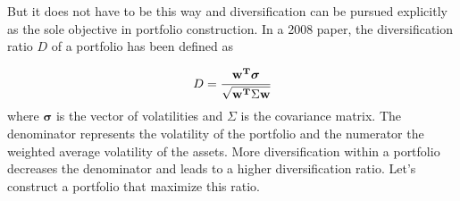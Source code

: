 But it does not have to be this way and diversification can be pursued explicitly as the sole objective in portfolio construction.
In a 2008 paper, the diversification ratio $D$ of a portfolio has been defined as

\begin{equation}
D=\cfrac{\mathbf{w^T}\boldsymbol{\sigma}}{\sqrt {\mathbf{w^T}\Sigma \mathbf{w}}} 
\end{equation}
where $\boldsymbol{\sigma}$ is the vector of volatilities and $\Sigma$ is the covariance matrix. The denominator represents the volatility of the portfolio and the numerator the weighted average volatility of the assets. More diversification within a portfolio decreases the denominator and leads to a higher diversification ratio.
Let's construct a portfolio that maximize this ratio.

